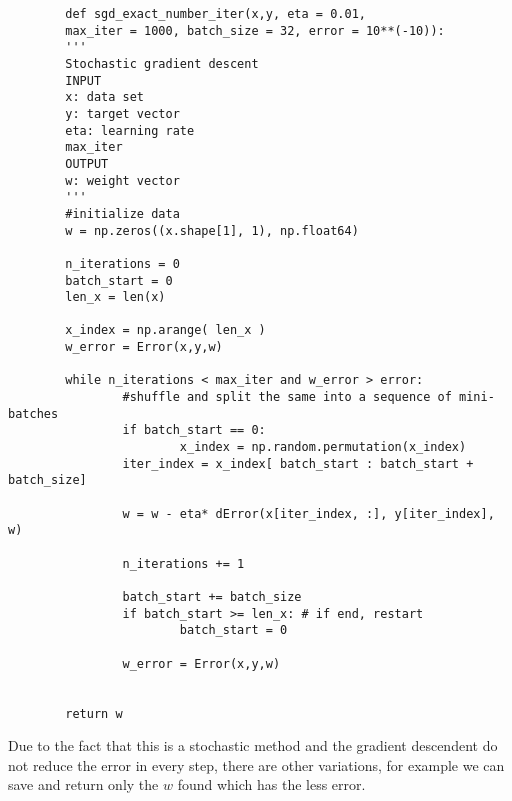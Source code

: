      \begin{verbatim}
        def sgd_exact_number_iter(x,y, eta = 0.01,
        max_iter = 1000, batch_size = 32, error = 10**(-10)):
        '''
        Stochastic gradient descent
        INPUT 
        x: data set
        y: target vector
        eta: learning rate
        max_iter 
        OUTPUT 
        w: weight vector
        '''
        #initialize data
        w = np.zeros((x.shape[1], 1), np.float64)
    
        n_iterations = 0
        batch_start = 0
        len_x = len(x)
    
        x_index = np.arange( len_x )
        w_error = Error(x,y,w)
 
        while n_iterations < max_iter and w_error > error:
                #shuffle and split the same into a sequence of mini-batches
                if batch_start == 0:
                        x_index = np.random.permutation(x_index)
                iter_index = x_index[ batch_start : batch_start + batch_size]

                w = w - eta* dError(x[iter_index, :], y[iter_index], w)
                
                n_iterations += 1

                batch_start += batch_size
                if batch_start >= len_x: # if end, restart
                        batch_start = 0
                
                w_error = Error(x,y,w)


        return w

      \end{verbatim}


      Due to the fact that this is a stochastic method and the gradient descendent do not reduce the error in every step,  there are other variations, for example we can save and return only the $w$ found which has the less error.


